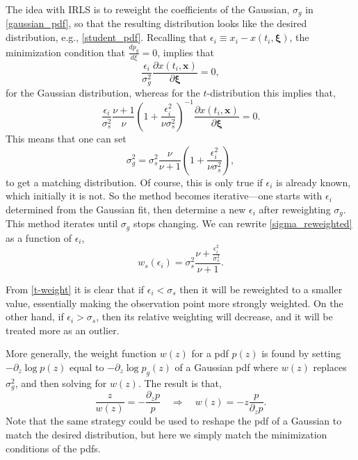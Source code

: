 \documentclass{ametsoc}
\begin{document}
The idea with IRLS is to reweight the coefficients of the Gaussian, $\sigma_g$ in \eqref{gaussian_pdf}, so that the resulting distribution looks like the desired distribution, e.g., \eqref{student_pdf}. Recalling that $\epsilon_i \equiv x_i - x(t_i,\mathbf{\xi})$, the minimization condition that $\frac{d p_g}{d\xi}=0$, implies that
\begin{equation}
\frac{\epsilon_i}{\sigma_g^2} \frac{\partial x(t_i,\mathbf{x})}{\partial \mathbf{\xi}} = 0,
\end{equation}
for the Gaussian distribution, whereas for the $t$-distribution this implies that,
\begin{equation}
 \frac{\epsilon_i}{\sigma_s^2} \frac{\nu+1}{\nu} \left( 1 + \frac{\epsilon_i^2}{\nu \sigma_s^2} \right)^{-1}  \frac{\partial x(t_i,\mathbf{x})}{\partial \mathbf{\xi}}  = 0.
\end{equation}
This means that one can set
\begin{equation}
\sigma_g^2 =   \sigma_s^2 \frac{\nu}{\nu+1} \left( 1 + \frac{\epsilon_i^2}{\nu \sigma_s^2} \right),
\label{sigma_reweighted}
\end{equation}
to get a matching distribution. Of course, this is only true if $\epsilon_i$ is already known, which initially it is not. So the method becomes iterative---one starts with $\epsilon_i$ determined from the Gaussian fit, then determine a new $\epsilon_i$ after reweighting $\sigma_g$. This method iterates until $\sigma_g$ stops changing. We can rewrite \eqref{sigma_reweighted} as a function of $\epsilon_i$,
\begin{equation}
\label{t-weight}
w_s(\epsilon_i) = \sigma_s^2 \frac{\nu  + \frac{\epsilon_i^2}{\sigma_s^2}}{\nu+1}.
\end{equation}

From \eqref{t-weight} it is clear that if $\epsilon_i < \sigma_s$ then it will be reweighted to a smaller value, essentially making the observation point more strongly weighted. On the other hand, if $\epsilon_i > \sigma_s$, then its relative weighting will decrease, and it will be treated more as an outlier.

More generally, the weight function $w(z)$ for a pdf $p(z)$ is found by setting $-\partial_z \log p(z)$ equal to $-\partial_z \log p_g(z)$ of a Gaussian pdf where $w(z)$ replaces $\sigma_g^2$,
and then solving for $w(z)$. The result is that,
\begin{equation}
    \frac{z}{w(z)} = - \frac{\partial_z p}{p}
\quad \Rightarrow \quad
    w(z) = -z \frac{p}{\partial_z p}.
\end{equation}
Note that the same strategy could be used to reshape the pdf of a Gaussian to match the desired distribution, but here we simply match the minimization conditions of the pdfs.
\end{document}
